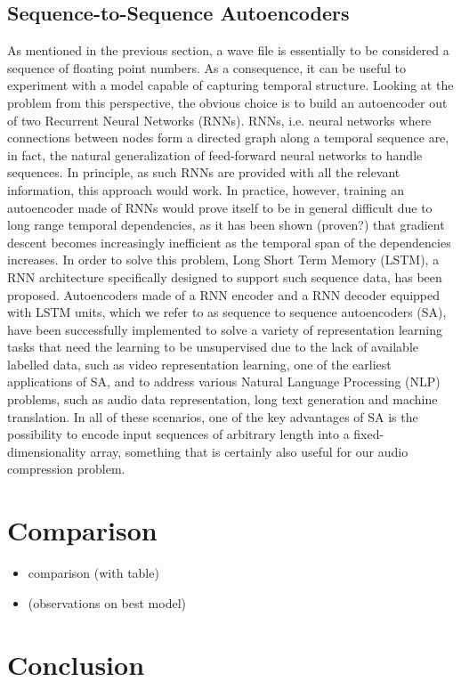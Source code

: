 \documentclass[11pt]{article}
\begin{document}
\subsection{Sequence-to-Sequence Autoencoders}
As mentioned in the previous section, a wave file is essentially to be considered a sequence of floating point numbers. As a consequence, it can be useful to experiment with a model capable of capturing temporal structure. Looking at the problem from this perspective, the obvious choice is to build an autoencoder out of two Recurrent Neural Networks (RNNs). RNNs, i.e. neural networks where connections between nodes form a directed graph along a temporal sequence are, in fact, the natural generalization of feed-forward neural networks to handle sequences. In principle, as such RNNs are provided with all the relevant information, this approach would work. In practice, however, training an autoencoder made of RNNs would prove itself to be in general difficult due to long range temporal dependencies, as it has been shown (proven?) that gradient descent becomes increasingly inefficient as the temporal span of the dependencies increases. In order to solve this problem, Long Short Term Memory (LSTM), a RNN architecture specifically designed to support such sequence data, has been proposed. Autoencoders made of a RNN encoder and a RNN decoder equipped with LSTM units, which we refer to as sequence to sequence autoencoders (SA), have been successfully implemented to solve a variety of representation learning tasks that need the learning to be unsupervised due to the lack of available labelled data, such as video representation learning, one of the earliest applications of SA, and to address various Natural Language Processing (NLP) problems, such as audio data representation, long text generation and machine translation. In all of these scenarios, one of the key advantages of SA is the possibility to encode input sequences of arbitrary length into a fixed-dimensionality array, something that is certainly also useful for our audio compression problem.
\section{Comparison}
\begin{itemize}
    \item comparison (with table)
    \item (observations on best model)
\end{itemize}

\section{Conclusion}
\end{document}
